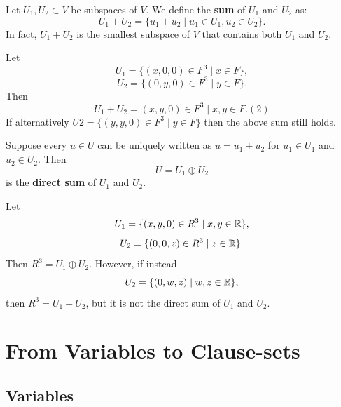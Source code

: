 \documentclass[12pt]{book}
\begin{document}
\begin{defi}\label{def:vcs_3}
      Let $U_1, U_2 \subset V$ be subspaces of $V$. We define the \textbf{sum} of $U_1$ and $U_2$ as:
      $$ U_1 + U_2 = \{u_1 + u_2 \mid u_1 \in U_1, u_2 \in U_2 \}.$$
	  In fact, $U_1 + U_2$ is the smallest subspace of $V$ that contains both $U_1$ and $U_2$.
\end{defi}

\begin{examp}\label{exp:subv4}
      Let 
      $$U_1 = \{(x, 0, 0) \in F^3 \mid x \in F \},$$
      $$U_2 = \{(0, y, 0) \in F^3 \mid y \in F \}.$$
      Then
      $$U_1 + U_2 = {(x, y, 0) \in F^3 \mid x, y \in F}. (2)$$
      If alternatively $U2 = \{(y, y, 0) \in F^3 \mid y \in F \}$ then the above sum still holds.    
\end{examp}

\begin{defi}\label{def:vcs_4}
      Suppose every $u \in U$ can be uniquely written as $u = u_1 +u_2$ for $u_1 \in U_1$ and $u_2 \in U_2$. 
	  Then
      $$U = U_1 \oplus U_2$$
      is the \textbf{direct sum} of $U_1$ and $U_2$.
\end{defi}
\begin{examp}\label{exp:subv5}
      Let
      $$U_1 = \{(x, y, 0) \in R^3 \mid x, y \in \mathbb{R} \},$$
      $$U_2 = \{(0, 0, z) \in R^3 \mid z \in \mathbb{R} \}.$$
      Then $R^3 = U_1 \oplus U_2$. However, if instead
      $$U_2 = \{(0,w, z) \mid w, z \in \mathbb{R} \},$$
      then $R^3 = U_1 + U_2$, but it is not the direct sum of $U_1$ and $U_2$.
\end{examp}

\chapter{From Variables to Clause-sets}
\label{cha:vartocls}

\section{Variables}
\label{sec:Variables}
\end{document}
